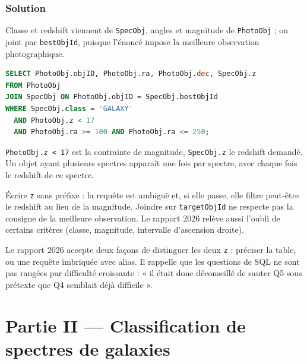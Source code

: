 \documentclass[11pt,a4paper]{article}
\begin{document}
\hypertarget{solution-4}{%
\subsubsection{Solution}\label{solution-4}}

Classe et redshift viennent de \texttt{SpecObj}, angles et magnitude de \texttt{PhotoObj} ; on joint par \texttt{bestObjId}, puisque l'énoncé impose la meilleure observation photographique.

\begin{lstlisting}[language=SQL]
SELECT PhotoObj.objID, PhotoObj.ra, PhotoObj.dec, SpecObj.z
FROM PhotoObj
JOIN SpecObj ON PhotoObj.objID = SpecObj.bestObjId
WHERE SpecObj.class = 'GALAXY'
  AND PhotoObj.z < 17
  AND PhotoObj.ra >= 100 AND PhotoObj.ra <= 250;
\end{lstlisting}

\texttt{PhotoObj.z\ \textless{}\ 17} est la contrainte de magnitude, \texttt{SpecObj.z} le redshift demandé. Un objet ayant plusieurs spectres apparaît une fois par spectre, avec chaque fois le redshift de ce spectre.

\begin{piege}

Écrire \texttt{z} sans préfixe : la requête est ambiguë et, si elle passe, elle filtre peut-être le redshift au lieu de la magnitude. Joindre sur \texttt{targetObjId} ne respecte pas la consigne de la meilleure observation. Le rapport 2026 relève aussi l'oubli de certains critères (classe, magnitude, intervalle d'ascension droite).

\end{piege}

\begin{jury}

Le rapport 2026 accepte deux façons de distinguer les deux \texttt{z} : préciser la table, ou une requête imbriquée avec alias. Il rappelle que les questions de SQL ne sont pas rangées par difficulté croissante : « il était donc déconseillé de sauter Q5 sous prétexte que Q4 semblait déjà difficile ».

\end{jury}

\hypertarget{partie-ii-classification-de-spectres-de-galaxies}{%
\section{Partie II --- Classification de spectres de galaxies}\label{partie-ii-classification-de-spectres-de-galaxies}}
\end{document}
